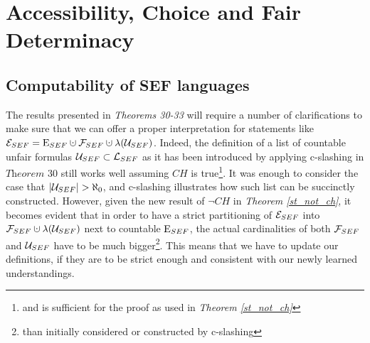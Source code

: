 \pagebreak
\section{Accessibility, Choice and Fair Determinacy}\label{section_determinacy}

\subsection{Computability of SEF languages}

The results presented in \textit{Theorems 30-33} will require a number of clarifications to make sure that we can offer a proper interpretation for statements like $\uesef = \cesef \cupdot \ufsef \cupdot \lambda(\uusef)$. Indeed, the definition of a list of countable unfair formulas $\mathcal{U}_{SEF} \subset \mathcal{L}_{SEF}$ as it has been introduced by applying c-slashing in $\textit{Theorem 30}$ still works well assuming $CH$ is true\footnote{and is sufficient for the proof as used in \textit{Theorem \ref{st_not_ch}}}. It was enough to consider the case that $|\mathcal{U}_{SEF}| > \aleph_0$, and c-slashing illustrates how such list can be succinctly constructed. However, given the new result of $\neg CH$ in \textit{Theorem \ref{st_not_ch}}, it becomes evident that in order to have a strict partitioning of $\mathcal{E}_{SEF}$ into $\ufsef \cupdot \lambda(\uusef)$ next to countable $\mathrm{E}_{SEF}$, the actual cardinalities of both $\mathcal{F}_{SEF}$ and $\mathcal{U}_{SEF}$ have to be much bigger\footnote{than initially considered or constructed by c-slashing}. This means that we have to update our definitions, if they are to be strict enough and consistent with our newly learned understandings.

